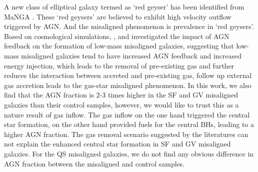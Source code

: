 A new class of elliptical galaxy termed as `red geyser' has been identified from MaNGA \citep{2016Natur.533..504C}. These `red geysers' are believed to exhibit high velocity outflow triggered by AGN. And the misaligned phenomenon is prevalence in `red geysers'. Based on cosmological simulations, \citet{starkenburg_origin_2019}, \citet{duckworth_decoupling_2020} and \citet{ koudmani_little_2021} investigated the impact of AGN feedback on the formation of low-mass misaligned galaxies, suggesting that low-mass misaligned galaxies tend to have increased AGN feedback and increased energy injection, which leads to the removal of pre-existing gas and further reduces the interaction between accreted and pre-existing gas, follow up external gas accretion leads to the gas-star misaligned phenomenon. In this work, we also find that the AGN fraction is 2-3 times higher in the SF and GV misaligned galaxies than their control samples, however, we would like to trust this as a nature result of gas inflow. The gas inflow on the one hand triggered the central star formation, on the other hand provided fuels for the central BHs, leading to a higher AGN fraction. The gas removal scenario suggested by the literatures can not explain the enhanced central star formation in SF and GV misaligned galaxies. For the QS misaligned galaxies, we do not find any obvious difference in AGN fraction between the misaligned and control samples.
